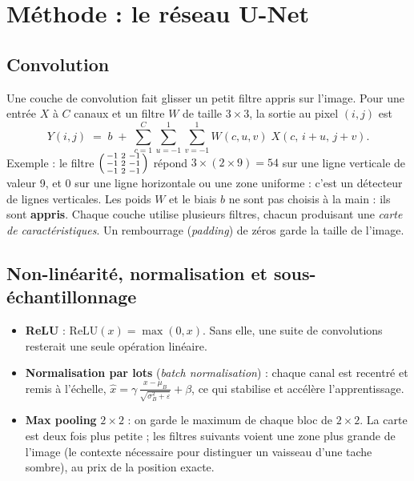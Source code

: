 \documentclass[11pt,a4paper]{article}
\begin{document}
\section{Méthode : le réseau U-Net}

\subsection{Convolution}
Une couche de convolution fait glisser un petit filtre appris sur l'image. Pour une entrée $X$ à $C$ canaux et un filtre $W$ de taille $3\times3$, la sortie au pixel $(i,j)$ est
\begin{equation}
Y(i,j) \;=\; b \;+\; \sum_{c=1}^{C}\sum_{u=-1}^{1}\sum_{v=-1}^{1} W(c,u,v)\; X(c,\,i+u,\,j+v).
\end{equation}
Exemple : le filtre $\begin{psmallmatrix}-1&2&-1\\-1&2&-1\\-1&2&-1\end{psmallmatrix}$ répond $3\times(2\times9)=54$ sur une ligne verticale de valeur 9, et $0$ sur une ligne horizontale ou une zone uniforme : c'est un détecteur de lignes verticales. Les poids $W$ et le biais $b$ ne sont pas choisis à la main : ils sont \textbf{appris}. Chaque couche utilise plusieurs filtres, chacun produisant une \emph{carte de caractéristiques}. Un rembourrage (\emph{padding}) de zéros garde la taille de l'image.

\subsection{Non-linéarité, normalisation et sous-échantillonnage}
\begin{itemize}
  \item \textbf{ReLU} : $\mathrm{ReLU}(x)=\max(0,x)$. Sans elle, une suite de convolutions resterait une seule opération linéaire.
  \item \textbf{Normalisation par lots} (\emph{batch normalisation}) \cite{bn} : chaque canal est recentré et remis à l'échelle,
  $\hat{x} = \gamma\,\frac{x-\mu_B}{\sqrt{\sigma_B^2+\varepsilon}} + \beta$, ce qui stabilise et accélère l'apprentissage.
  \item \textbf{Max pooling} $2\times2$ : on garde le maximum de chaque bloc de $2\times2$. La carte est deux fois plus petite ; les filtres suivants voient une zone plus grande de l'image (le contexte nécessaire pour distinguer un vaisseau d'une tache sombre), au prix de la position exacte.
\end{itemize}
\end{document}
